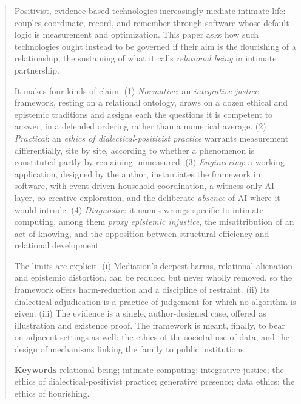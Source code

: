 \documentclass[11pt,a4paper]{article}
\begin{document}
\begin{abstract}
\noindent
Positivist, evidence-based technologies increasingly mediate intimate life: couples coordinate, record, and remember through software whose default logic is measurement and optimization. This paper asks how such technologies ought instead to be governed if their aim is the flourishing of a relationship, the sustaining of what it calls \emph{relational being} in intimate partnership.

\smallskip
\noindent It makes four kinds of claim. (1) \emph{Normative}: an \emph{integrative-justice} framework, resting on a relational ontology, draws on a dozen ethical and epistemic traditions and assigns each the questions it is competent to answer, in a defended ordering rather than a numerical average. (2) \emph{Practical}: an \emph{ethics of dialectical-positivist practice} warrants measurement differentially, site by site, according to whether a phenomenon is constituted partly by remaining unmeasured. (3) \emph{Engineering}: a working application, designed by the author, instantiates the framework in software, with event-driven household coordination, a witness-only AI layer, co-creative exploration, and the deliberate \emph{absence} of AI where it would intrude. (4) \emph{Diagnostic}: it names wrongs specific to intimate computing, among them \emph{proxy epistemic injustice}, the misattribution of an act of knowing, and the opposition between structural efficiency and relational development.

\smallskip
\noindent The limits are explicit. (i) Mediation's deepest harms, relational alienation and epistemic distortion, can be reduced but never wholly removed, so the framework offers harm-reduction and a discipline of restraint. (ii) Its dialectical adjudication is a practice of judgement for which no algorithm is given. (iii) The evidence is a single, author-designed case, offered as illustration and existence proof. The framework is meant, finally, to bear on adjacent settings as well: the ethics of the societal use of data, and the design of mechanisms linking the family to public institutions.

\vspace{0.6em}
\noindent\textbf{Keywords}\quad
relational being; intimate computing; integrative justice; the ethics of dialectical-positivist practice; generative presence; data ethics; the ethics of flourishing.
\end{abstract}
\end{document}
